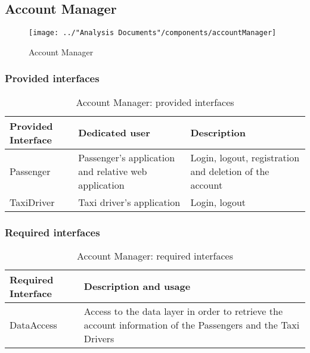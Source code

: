 \subsection{Account Manager}\label{comp:accountManager}
\begin{figure}[H]
	\centering
	\texttt{[image: ../"Analysis Documents"/components/accountManager]}
	\label{fig:accountManager}
	\caption{Account Manager}
\end{figure}
\subsubsection{Provided interfaces}
\begin{table}[H]
\begin{longtable}{| p{} | p{} | p{} |}
\hline
 \textbf{Provided Interface} & \textbf{Dedicated user} & \textbf{Description} \\ \hline
Passenger & Passenger's application and relative web application & Login, logout, registration and deletion of the account \\ \hline
TaxiDriver & Taxi driver's application & Login, logout \\ \hline
\end{longtable}
\caption{Account Manager: provided interfaces}
\label{tab:accountManager:providedInterfaces}
\end{table}
\subsubsection{Required interfaces}
\begin{table}[H]
\begin{longtable}{| l | p{} |}
\hline
 \textbf{Required Interface} & \textbf{Description and usage} \\ \hline
DataAccess & Access to the data layer in order to retrieve the account information of the Passengers and the Taxi Drivers \\ \hline
\end{longtable}
\caption{Account Manager: required interfaces}
\label{tab:accountManager:requiredInterfaces}
\end{table}
